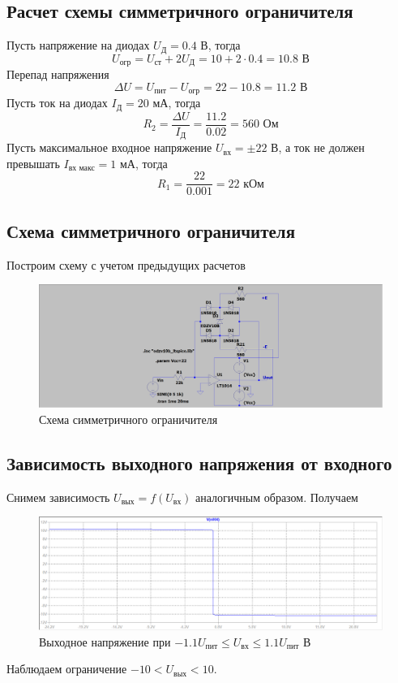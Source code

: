 \documentclass[a4paper, 12pt]{article}
\begin{document}
    \subsection{Расчет схемы симметричного ограничителя}
    Пусть напряжение на диодах $U_\text{Д}=0.4$ В, тогда
    $$
    U_\text{огр}=U_\text{ст}+2U_\text{Д}=10+2\cdot0.4=10.8\text{ В}
    $$
    Перепад напряжения
    $$
    \Delta U=U_\text{пит}-U_\text{огр}=22-10.8=11.2\text{ В}
    $$
    Пусть ток на диодах $I_\text{Д}=20$ мА, тогда
    $$
    R_2=\dfrac{\Delta U}{I_\text{Д}}=\dfrac{11.2}{0.02}=560\text{ Ом}
    $$
    Пусть максимальное входное напряжение $U_\text{вх}=\pm22$ В, а ток
    не должен превышать $I_\text{вх макс}=1$ мА, тогда
    $$
    R_1=\dfrac{22}{0.001}=22\text{ кОм}
    $$


    \subsection{Схема симметричного ограничителя}
    Построим схему с учетом предыдущих расчетов
    \begin{figure}[H]
        \centering
        \includegraphics[scale=0.22]{scheme13.png}
        \captionsetup{skip=0pt}
        \caption{Схема симметричного ограничителя}
        \label{fig:scheme13}
    \end{figure}


    \subsection{Зависимость выходного напряжения от входного}
    Снимем зависимость $U_\text{вых}=f\left( U_\text{вх} \right)$ аналогичным образом.
    Получаем
    \begin{figure}[H]
        \centering
        \includegraphics[scale=0.46]{0task_fuin.png}
        \captionsetup{skip=0pt}
        \caption{Выходное напряжение при $-1.1U_\text{пит}\leq U_\text{вх}\leq 1.1U_\text{пит}$ В}
        \label{fig:0task_fuin}
    \end{figure}
    Наблюдаем ограничение $-10<U_\text{вых}<10$.
\end{document}
